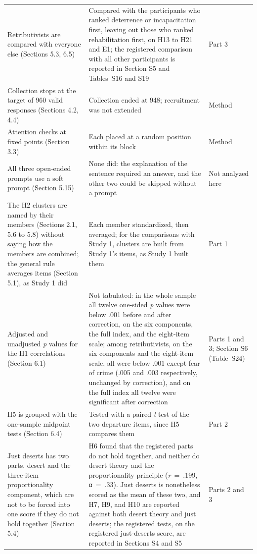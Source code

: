 \begin{longtable}{@{}>{\raggedright\arraybackslash}p{2.483in}>{\raggedright\arraybackslash}p{2.181in}>{\raggedright\arraybackslash}p{1.503in}@{}}
Retributivists are compared with everyone else (Sections 5.3, 6.5) & Compared with the participants who ranked deterrence or incapacitation first, leaving out those who ranked rehabilitation first, on H13 to H21 and E1; the registered comparison with all other participants is reported in Section S5 and Tables~S16 and S19 & Part 3 \\
Collection stops at the target of 960 valid responses (Sections 4.2, 4.4) & Collection ended at 948; recruitment was not extended & Method \\
Attention checks at fixed points (Section 3.3) & Each placed at a random position within its block & Method \\
All three open-ended prompts use a soft prompt (Section 5.15) & None did: the explanation of the sentence required an answer, and the other two could be skipped without a prompt & Not analyzed here \\
The H2 clusters are named by their members (Sections 2.1, 5.6 to 5.8) without saying how the members are combined; the general rule averages items (Section 5.1), as Study 1 did & Each member standardized, then averaged; for the comparisons with Study 1, clusters are built from Study 1's items, as Study 1 built them & Part 1 \\
Adjusted and unadjusted \emph{p} values for the H1 correlations (Section 6.1) & Not tabulated: in the whole sample all twelve one-sided \emph{p} values were below .001 before and after correction, on the six components, the full index, and the eight-item scale; among retributivists, on the six components and the eight-item scale, all were below .001 except fear of crime (.005 and .003 respectively, unchanged by correction), and on the full index all twelve were significant after correction & Parts 1 and 3; Section S6 (Table~S24) \\
H5 is grouped with the one-sample midpoint tests (Section 6.4) & Tested with a paired \emph{t} test of the two departure items, since H5 compares them & Part 2 \\
Just deserts has two parts, desert and the three-item proportionality component, which are not to be forced into one score if they do not hold together (Section 5.4) & H6 found that the registered parts do not hold together, and neither do desert theory and the proportionality principle (\emph{r}~=~.199, α~=~.33). Just deserts is nonetheless scored as the mean of these two, and H7, H9, and H10 are reported against both desert theory and just deserts; the registered tests, on the registered just-deserts score, are reported in Sections S4 and S5 & Parts 2 and 3 \\

\end{longtable}
